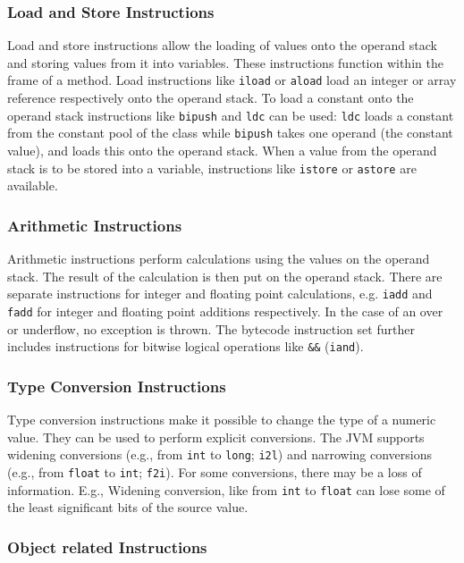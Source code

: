 \subsubsection{Load and Store Instructions}

Load and store instructions allow the loading of values onto the operand stack and storing values from it into variables. These instructions function within the frame of a method. Load instructions like \texttt{iload} or \texttt{aload} load an integer or array reference respectively onto the operand stack. To load a constant onto the operand stack instructions like \texttt{bipush} and \texttt{ldc} can be used: \texttt{ldc} loads a constant from the constant pool of the class while \texttt{bipush} takes one operand (the constant value), and loads this onto the operand stack. When a value from the operand stack is to be stored into a variable, instructions like \texttt{istore} or \texttt{astore} are available. 

\subsubsection{Arithmetic Instructions}

Arithmetic instructions perform calculations using the values on the operand stack. The result of the calculation is then put on the operand stack. There are separate instructions for integer and floating point calculations, e.g. \texttt{iadd} and \texttt{fadd} for integer and floating point additions respectively. In the case of an over or underflow, no exception is thrown. The bytecode instruction set further includes instructions for bitwise logical operations like \verb|&&| (\texttt{iand}). 

\subsubsection{Type Conversion Instructions}

Type conversion instructions make it possible to change the type of a numeric value. They can be used to perform explicit conversions. The JVM supports widening conversions (e.g., from \texttt{int} to \texttt{long}; \texttt{i2l}) and narrowing conversions (e.g., from \texttt{float} to \texttt{int}; \texttt{f2i}). For some conversions, there may be a loss of information. E.g., Widening conversion, like from \texttt{int} to \texttt{float} can lose some of the least significant bits of the source value. 

\subsubsection{Object related Instructions}

